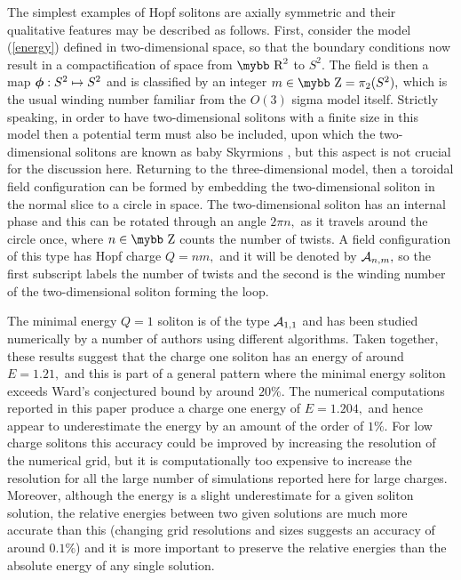 \documentclass[12pt]{article}
\newcommand{\bphi}{\mbox{\boldmath $\phi$}}
\def\bb#1{\hbox{\mybb#1}}
\begin{document}
The simplest examples of Hopf solitons are axially symmetric and
their qualitative features may be described as follows. First,
consider the model (\ref{energy}) defined in two-dimensional space,
so that the boundary conditions now result in a compactification of
space from $\bb{R}^2$ to $S^2.$ The field is then a map
$\bphi:S^2\mapsto S^2$ and is classified by an integer $m\in\bb{Z}
=\pi_2(S^2),$ which is the usual winding number familiar from the
$O(3)$ sigma model itself. Strictly speaking, in order to have
two-dimensional solitons with a finite size in this model then a
potential term must also be included, upon which the two-dimensional
solitons are known as baby Skyrmions \cite{PSZ}, but this aspect is
not crucial for the discussion here. Returning to the
three-dimensional model, then a toroidal field configuration can be
formed by embedding the two-dimensional soliton in the normal slice
to a circle in space. The two-dimensional soliton has an internal
phase and this can be rotated through an angle $2\pi n,$ as it
travels around the circle once, where $n\in \bb{Z}$ counts the
number of twists. A field configuration of this type has Hopf charge
$Q=nm,$ and it will be denoted by ${\cal A}_{n,m},$ so the first
subscript labels the number of twists and the second is the winding
number of the two-dimensional soliton forming the loop.

The minimal energy $Q=1$ soliton is of the type ${\cal A}_{1,1}$ and
has been studied numerically by a number of authors 
\cite{GH,FN,BS5,HS,Wa5} using different algorithms. 
Taken together, these results suggest that the charge one soliton has
an energy of around $E=1.21,$ and this is part of a
general pattern where the minimal energy soliton exceeds Ward's
conjectured bound by around $20\%.$ The numerical computations
reported in this paper produce a charge one energy of $E=1.204,$ and
hence appear to underestimate the energy by an amount of the order
of $1\%.$ For low charge solitons this accuracy could be improved by
increasing the resolution of the numerical grid, but it is
computationally too expensive to increase the resolution for all the
large number of simulations reported here for large charges.
Moreover, although the energy is a slight underestimate for a given
soliton solution, the relative energies between two given solutions
are much more accurate than this (changing grid resolutions and
sizes suggests an accuracy of around $0.1\%$) and it is more
important to preserve the relative energies than the absolute energy
of any single solution.
\end{document}
